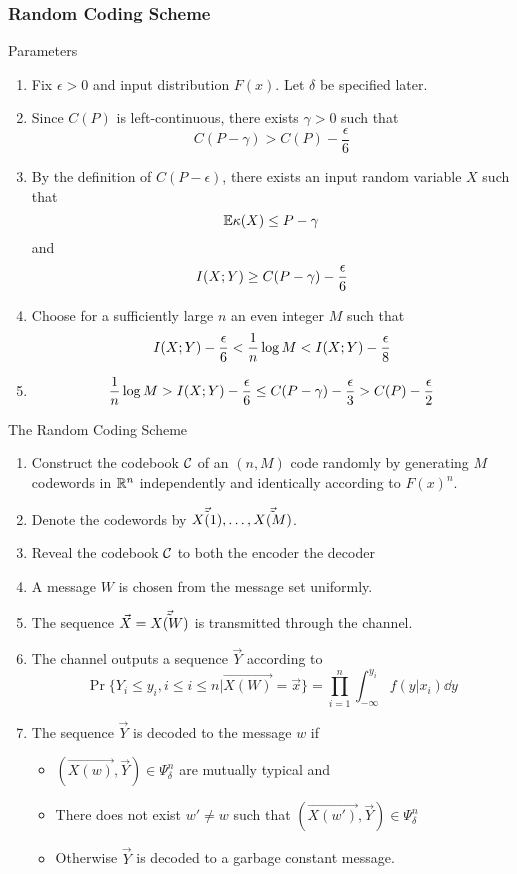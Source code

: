 \documentclass[../main.tex]{subfiles}
\begin{document}
\subsubsection{Random Coding Scheme}
Parameters
\begin{enumerate}
    \item Fix $\epsilon>0$ and input distribution $F(x)$. Let $\delta$ be specified later.
    \item Since $C(P)$ is left-continuous, there exists $\gamma>0$ such that \[
    C(P-\gamma) > C(P)-\frac{\epsilon}{6}
    \]
    \item By the definition of $C(P-\epsilon)$, there exists an input random variable $X$ such that \[
    \mathbb{E} \kappa(X)\leq P-\gamma 
    \] and \[
    I(X;Y)\geq C(P-\gamma)-\frac{\epsilon}{6}
    \]
    \item Choose for a sufficiently large $n$ an even integer $M$ such that \[
        I(X;Y)-\frac{\epsilon}{6} < \frac{1}{n}\log M < I(X;Y) - \frac{\epsilon}{8}
    \]
    \item \[
    \frac{1}{n}\log M > I(X;Y)-\frac{\epsilon}{6}\leq C(P-\gamma)-\frac{\epsilon}{3} > C(P)-\frac{\epsilon}{2}
    \]
\end{enumerate}
The Random Coding Scheme
\begin{enumerate}
    \item Construct the codebook $\mathcal{C}$ of an $(n,M)$ code randomly by generating $M$ codewords in $\mathbb{R}^n$ independently and identically according to $F(x)^n$.
    \item Denote the codewords by $\vec{\Tilde{X(1)}},\dots,\vec{\Tilde{X(M)}}$.
    \item Reveal the codebook $\mathcal{C}$ to both the encoder the decoder
    \item A message $W$ is chosen from the message set uniformly.
    \item The sequence $\vec X=\vec{\Tilde{X(W)}}$ is transmitted through the channel.
    \item The channel outputs a sequence $\vec Y$ according to \[
    \Pr\{Y_i\leq y_i,i\leq i\leq n|\vec{X(W)}=\vec x\}=\prod_{i=1}^n\int_{-\infty}^{y_i}f(y|x_i)\dd y
    \]
    \item The sequence $\vec Y$ is decoded to the message $w$ if \begin{itemize}
        \item $(\vec{X(w)},\vec Y)\in \Psi^n_\delta$ are mutually typical and
        \item There does not exist $w'\neq w$ such that $(\vec{X(w')},\vec Y)\in \Psi^n_\delta$
        \item Otherwise $\vec Y$ is decoded to a garbage constant message.
    \end{itemize}
\end{enumerate}
\end{document}
